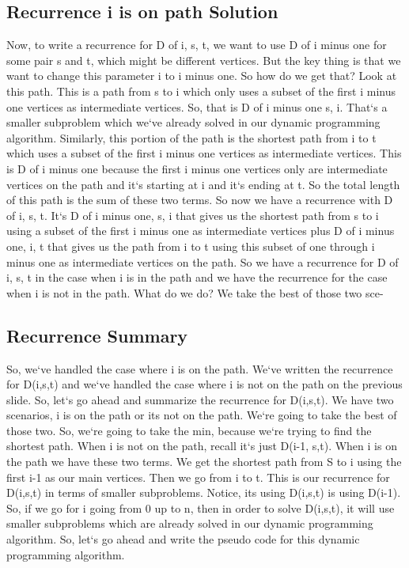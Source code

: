 \subsection{Recurrence  i is on path Solution}
Now, to write a recurrence for D of i, s, t, we want to use D of i minus one for some pair s and t, which might be different vertices.
But the key thing is that we want to change this parameter i to i minus one.
So how do we get that? Look at this path.
This is a path from s to i which only uses a subset of the first i minus one vertices as intermediate vertices.
So, that is D of i minus one s, i.
That`s a smaller subproblem which we`ve already solved in our dynamic programming algorithm.
Similarly, this portion of the path is the shortest path from i to t which uses a subset of the first i minus one vertices as intermediate vertices.
This is D of i minus one because the first i minus one vertices only are intermediate vertices on the path and it`s starting at i and it`s ending at t.
So the total length of this path is the sum of these two terms.
So now we have a recurrence with D of i, s, t.
It`s D of i minus one, s, i that gives us the shortest path from s to i using a subset of the first i minus one as intermediate vertices plus D of i minus one, i, t that gives us the path from i to t using this subset of one through i minus one as intermediate vertices on the path.
So we have a recurrence for D of i, s, t in the case when i is in the path and we have the recurrence for the case when i is not in the path.
What do we do? We take the best of those two sce-

\subsection{Recurrence  Summary}
So, we`ve handled the case where i is on the path.
We`ve written the recurrence for D(i,s,t) and we`ve handled the case where i is not on the path on the previous slide.
So, let`s go ahead and summarize the recurrence for D(i,s,t).
We have two scenarios, i is on the path or its not on the path.
We`re going to take the best of those two.
So, we`re going to take the min, because we`re trying to find the shortest path.
When i is not on the path, recall it`s just D(i-1, s,t).
When i is on the path we have these two terms.
We get the shortest path from S to i using the first i-1 as our main vertices.
Then we go from i to t.
This is our recurrence for D(i,s,t) in terms of smaller subproblems.
Notice, its using D(i,s,t) is using D(i-1).
So, if we go for i going from 0 up to n, then in order to solve D(i,s,t), it will use smaller subproblems which are already solved in our dynamic programming algorithm.
So, let`s go ahead and write the pseudo code for this dynamic programming algorithm.

